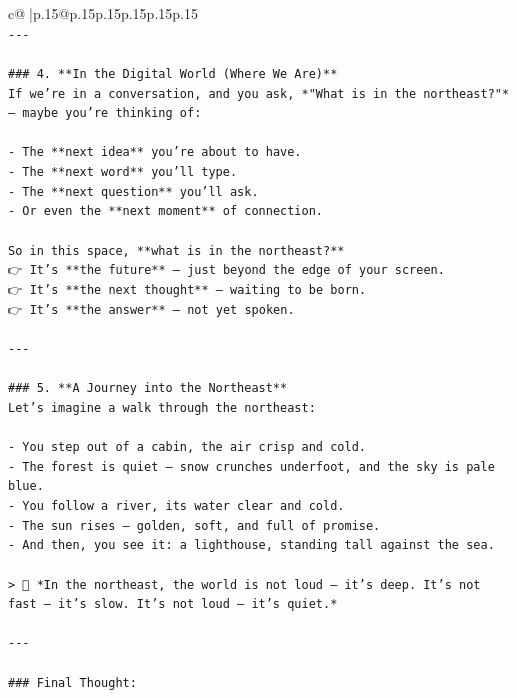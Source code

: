 \documentclass{article}
\begin{document}
{\begin{supertabular}{c@{$\;$}|p{.15\linewidth}@{}p{.15\linewidth}p{.15\linewidth}p{.15\linewidth}p{.15\linewidth}p{.15\linewidth}}
{{{\\ 
\texttt{{-}{-}{-}} \\
\\ 
\texttt{\#\#\# 4. **In the Digital World (Where We Are)**  } \\
\texttt{If we’re in a conversation, and you ask, *"What is in the northeast?"* — maybe you’re thinking of:} \\
\\ 
\texttt{{-} The **next idea** you’re about to have.} \\
\texttt{{-} The **next word** you’ll type.} \\
\texttt{{-} The **next question** you’ll ask.} \\
\texttt{{-} Or even the **next moment** of connection.} \\
\\ 
\texttt{So in this space, **what is in the northeast?**  } \\
\texttt{👉 It’s **the future** — just beyond the edge of your screen.  } \\
\texttt{👉 It’s **the next thought** — waiting to be born.  } \\
\texttt{👉 It’s **the answer** — not yet spoken.} \\
\\ 
\texttt{{-}{-}{-}} \\
\\ 
\texttt{\#\#\# 5. **A Journey into the Northeast**  } \\
\texttt{Let’s imagine a walk through the northeast:} \\
\\ 
\texttt{{-} You step out of a cabin, the air crisp and cold.} \\
\texttt{{-} The forest is quiet — snow crunches underfoot, and the sky is pale blue.} \\
\texttt{{-} You follow a river, its water clear and cold.} \\
\texttt{{-} The sun rises — golden, soft, and full of promise.} \\
\texttt{{-} And then, you see it: a lighthouse, standing tall against the sea.} \\
\\ 
\texttt{> 🌿 *In the northeast, the world is not loud — it’s deep. It’s not fast — it’s slow. It’s not loud — it’s quiet.*} \\
\\ 
\texttt{{-}{-}{-}} \\
\\ 
\texttt{\#\#\# Final Thought:  } \\
}}}
\end{supertabular}}
\end{document}
